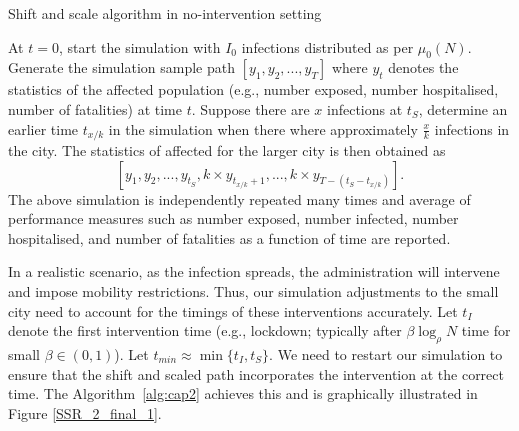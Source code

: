 \documentclass{article}
\theoremstyle{definition}
\begin{document}
\begin{algorithm}
\caption{Shift and scale algorithm in no-intervention setting}\label{alg:cap}
\begin{algorithmic}[1]
 \State   At $t=0$, start the simulation with $I_0$ infections distributed as per $\mu_0(N)$.
 Generate the simulation sample path 
 $[y_1,y_2,...,y_{T}]$ 
 where $y_t$ denotes the statistics of the affected population (e.g., number exposed, number hospitalised, 
 number of fatalities)  at time $t$. 
  \bigskip
 \State Suppose there are $x$ infections at $t_{S}$, determine an earlier time $t_{x/k}$ in the
  simulation when there where approximately $\frac{x}{k}$ infections in the city. 
 \bigskip
 \State  The statistics of affected for the larger city is then obtained as  
 \[
 [y_1,y_2,...,y_{t_S}, k \times y_{t_{x/k}+1},...,k \times y_{T-( t_S-t_{x/k})}].
 \]
 \bigskip
\State 
The above simulation is independently repeated many times and average of performance measures such as number exposed, number infected, number hospitalised, and number of fatalities as a function of time are reported.
\end{algorithmic}
\end{algorithm}

In a realistic scenario, as the infection spreads,  the administration will intervene and impose mobility restrictions.
Thus, our simulation adjustments to the small city need to account for the timings of these interventions accurately. 
Let $t_{I}$ denote the first intervention time (e.g., lockdown; typically
after $\beta \log_\rho N$ time for small $\beta \in (0,1)$).  Let $t_{min} \approx  \min\{t_{I},t_{S}\}$. 
We need to restart our simulation to ensure that the shift and scaled path
incorporates the intervention at the correct time. The Algorithm~\ref{alg:cap2}
achieves this and is graphically illustrated in Figure  \ref{SSR_2_final_1}. 
\end{document}
